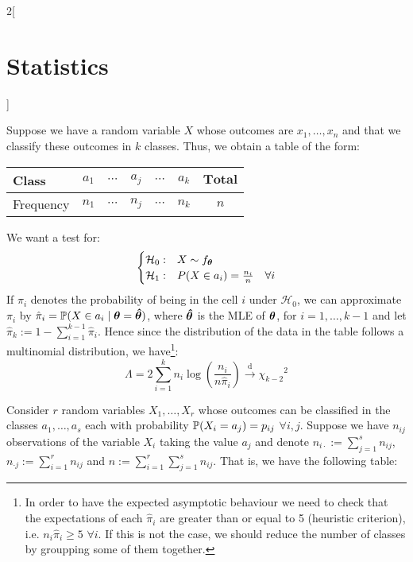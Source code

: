 \documentclass[../../../main_math.tex]{subfiles}
\begin{document}
\begin{multicols}{2}[\section{Statistics}]
\begin{theorem}
  \end{theorem}
  \begin{definition}
    Suppose we have a random variable $X$ whose outcomes are $x_1,\ldots,x_n$ and that we classify these outcomes in $k$ classes. Thus, we obtain a table of the form:
    \begin{center}
      \begin{minipage}{\linewidth}
        \centering
        \begin{tabular}{l||ccccc|c}
          Class     & $a_1$   & $\cdots$ & $a_j$   & $\cdots$ & $a_k$   & $\mathbf{Total}$ \\
          \hline
          Frequency & $n_{1}$ & $\cdots$ & $n_{j}$ & $\cdots$ & $n_{k}$ & $n$              \\
        \end{tabular}
      \end{minipage}
    \end{center}
    We want a test for:
    $$
      \begin{cases}
        \mathcal{H}_0: & X\sim f_{\boldsymbol{\mathrm{\theta}}}                     \\
        \mathcal{H}_1: & P(X\in a_i)=\frac{n_i}{n}\quad\forall i
      \end{cases}
    $$
    If $\pi_i$ denotes the probability of being in the cell $i$ under $\mathcal{H}_0$, we can approximate $\pi_i$ by $\hat\pi_i=\mathbb{P}(X\in a_i\mid {\boldsymbol{\mathrm{\theta}}}={\boldsymbol{\mathrm{\hat\theta}}})$, where ${\boldsymbol{\mathrm{\hat\theta}}}$ is the MLE of ${\boldsymbol{\mathrm{\theta}}}$, for $i=1,\ldots,k-1$ and let $\hat\pi_k:=1-\sum_{i=1}^{k-1}\hat\pi_i$. Hence since the distribution of the data in the table follows a multinomial distribution, we have\footnote{In order to have the expected asymptotic behaviour we need to check that the expectations of each $\hat\pi_i$ are greater than or equal to 5 (heuristic criterion), i.e. $n_i\hat\pi_i\geq 5$ $\forall i$. If this is not the case, we should reduce the number of classes by groupping some of them together.}:
    $$\Lambda=2\sum_{i=1}^kn_i\log\left(\frac{n_i}{n\hat\pi_i}\right)\overset{\text{d}}{\longrightarrow}{\chi_{k-2}}^2$$
  \end{definition}
  \begin{definition}
    Consider $r$ \iid random variables $X_1,\ldots,X_r$ whose outcomes can be classified in the classes $a_1,\ldots,a_s$ each with probability $\mathbb{P}(X_i=a_j)=p_{ij}$ $\forall i,j$. Suppose we have $n_{ij}$ observations of the variable $X_i$ taking the value $a_j$ and denote $n_{i\cdot}:=\sum_{j=1}^sn_{ij}$, $n_{\cdot j}:=\sum_{i=1}^rn_{ij}$ and $n:=\sum_{i=1}^r\sum_{j=1}^sn_{ij}$. That is, we have the following table:

\end{definition}
\end{multicols}
\end{document}
